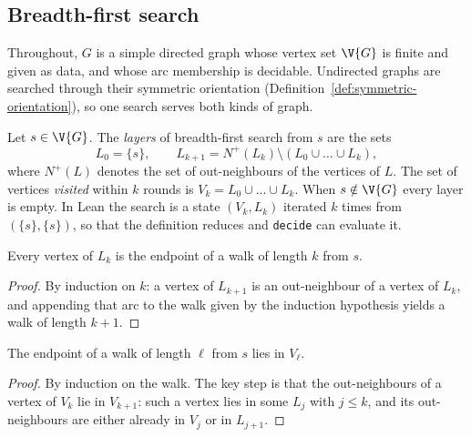 %
\subsection{Breadth-first search}

Throughout, $G$ is a simple directed graph whose vertex set $\V{G}$ is finite and given as
data, and whose arc membership is decidable. Undirected graphs are searched through their
symmetric orientation (Definition~\ref{def:symmetric-orientation}), so one search serves
both kinds of graph.

\begin{definition}
  \label{def:bfs-layers}
  \leanok
  Let $s \in \V{G}$. The \emph{layers} of breadth-first search from $s$ are the sets
  \[
    L_0 = \{s\}, \qquad
    L_{k+1} = N^+(L_k) \setminus (L_0 \cup \dots \cup L_k),
  \]
  where $N^+(L)$ denotes the set of out-neighbours of the vertices of $L$. The set of
  vertices \emph{visited} within $k$ rounds is $V_k = L_0 \cup \dots \cup L_k$. When
  $s \notin \V{G}$ every layer is empty.
  In Lean the search is a state $(V_k, L_k)$ iterated $k$ times from $(\{s\}, \{s\})$,
  so that the definition reduces and \texttt{decide} can evaluate it.
\end{definition}

\begin{lemma}[Soundness]
  \label{lem:bfs-sound}
  \leanok
  Every vertex of $L_k$ is the endpoint of a walk of length $k$ from $s$.
\end{lemma}
\begin{proof}
  \leanok
  By induction on $k$: a vertex of $L_{k+1}$ is an out-neighbour of a vertex of $L_k$,
  and appending that arc to the walk given by the induction hypothesis yields a walk of
  length $k + 1$.
\end{proof}

\begin{lemma}[Completeness]
  \label{lem:bfs-complete}
  \leanok
  The endpoint of a walk of length $\ell$ from $s$ lies in $V_\ell$.
\end{lemma}
\begin{proof}
  \leanok
  By induction on the walk. The key step is that the out-neighbours of a vertex of $V_k$
  lie in $V_{k+1}$: such a vertex lies in some $L_j$ with $j \le k$, and its
  out-neighbours are either already in $V_j$ or in $L_{j+1}$.
\end{proof}


